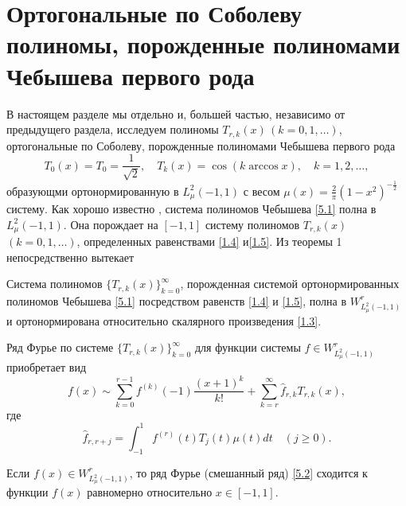  \section{Ортогональные по Соболеву полиномы, порожденные полиномами Чебышева первого рода}
 В настоящем разделе мы отдельно и, большей частью, независимо от предыдущего раздела, исследуем полиномы $T_{r,k}(x)\,(k=0,1,\ldots)$, ортогональные по Соболеву, порожденные полиномами Чебышева первого рода
\begin{equation}\label{5.1}
T_0(x)=T_0=\frac{1}{\sqrt{2}},\quad T_k(x)=\cos(k\arccos x), \quad k=1,2,\ldots,
\end{equation}
образующми  ортонормированную  в $L_\mu^2(-1,1)$ с весом  $\mu(x)=\frac2\pi(1-x^2)^{-\frac12}$ систему. Как хорошо известно \cite{Sege}, система полиномов Чебышева \eqref{5.1} полна в $L_\mu^2(-1,1)$.   Она порождает на $[-1,1]$ систему полиномов $T_{r,k}(x)$ $(k=0,1,\ldots)$, определенных равенствами \eqref{1.4} и\eqref{1.5}.
Из теоремы 1 непосредственно вытекает
\begin{corollary}
  Система полиномов $\{T_{r,k}(x)\}_{k=0}^\infty$, порожденная системой ортонормированных полиномов Чебышева \eqref{5.1} посредством равенств \eqref{1.4} и \eqref{1.5}, полна  в $W^r_{L^2_\mu(-1,1)}$ и ортонормирована относительно скалярного произведения \eqref{1.3}.
\end{corollary}

Ряд Фурье по системе $\{T_{r,k}(x)\}_{k=0}^\infty$ для функции системы   $f\in W^r_{L^2_\mu(-1,1)}$ приобретает вид
\begin{equation}\label{5.2}
f(x)\sim \sum_{k=0}^{r-1} f^{(k)}(-1)\frac{(x+1)^k}{k!}+ \sum_{k=r}^\infty \hat f_{r,k}T_{r,k}(x),
\end{equation}
где
  \begin{equation}\label{5.3}
 \hat f_{r,r+j}=\int_{-1}^1 f^{(r)}(t)T_{j}(t)\mu(t)dt\quad(j\ge0).
\end{equation}

\begin{corollary}
 Если $f(x)\in W^r_{L^2_\mu(-1,1)}$, то ряд Фурье (смешанный ряд) \eqref{5.2} сходится к функции $f(x)$ равномерно относительно $x\in[-1,1]$.
\end{corollary}

